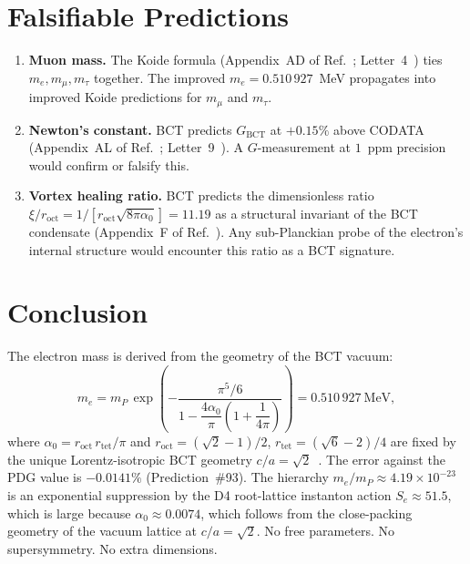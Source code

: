 \documentclass[twocolumn,10pt,a4paper]{article}
\begin{document}
\section*{Falsifiable Predictions}

\begin{enumerate}
  \item \textbf{Muon mass.} The Koide formula (Appendix~AD of
    Ref.~\cite{monograph}; Letter~4~\cite{generations}) ties
    $m_e, m_\mu, m_\tau$ together.  The improved $m_e = 0.510\,927$~MeV
    propagates into improved Koide predictions for $m_\mu$ and $m_\tau$.

  \item \textbf{Newton's constant.} BCT predicts $G_\mathrm{BCT}$ at
    $+0.15\%$ above CODATA (Appendix~AL of Ref.~\cite{monograph};
    Letter~9~\cite{planck}).  A $G$-measurement at $1$~ppm precision
    would confirm or falsify this.

  \item \textbf{Vortex healing ratio.} BCT predicts the dimensionless ratio
    $\xi/r_\mathrm{oct} = 1/[r_\mathrm{oct}\sqrt{8\pi\alpha_0}] = 11.19$
    as a structural invariant of the BCT condensate
    (Appendix~F of Ref.~\cite{monograph}).  Any sub-Planckian probe of
    the electron's internal structure would encounter this ratio as a BCT
    signature.
\end{enumerate}

\section*{Conclusion}

The electron mass is derived from the geometry of the BCT vacuum:
\begin{equation}
  m_e = m_P\,\exp\!\left(-\frac{\pi^5/6}{1-\dfrac{4\alpha_0}{\pi}
  \!\left(1+\dfrac{1}{4\pi}\right)}\right)
  = 0.510\,927~\mathrm{MeV},
  \label{eq:final_box}
\end{equation}
where $\alpha_0 = r_\mathrm{oct}\,r_\mathrm{tet}/\pi$ and
$r_\mathrm{oct}=(\sqrt{2}-1)/2$, $r_\mathrm{tet}=(\sqrt{6}-2)/4$ are fixed
by the unique Lorentz-isotropic BCT geometry $c/a=\sqrt{2}$~\cite{lorentz}.
The error against the PDG value is $\mathbf{-0.0141\%}$ (Prediction~\#93).
The hierarchy $m_e/m_P \approx 4.19\times10^{-23}$ is an exponential
suppression by the D4 root-lattice instanton action $S_e\approx51.5$,
which is large because $\alpha_0\approx0.0074$, which follows from the
close-packing geometry of the vacuum lattice at $c/a=\sqrt{2}$. No free
parameters. No supersymmetry. No extra dimensions.
\end{document}
